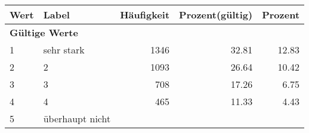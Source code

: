      \begin{longtable}{lXrrr}
     \toprule
     \textbf{Wert} & \textbf{Label} & \textbf{Häufigkeit} & \textbf{Prozent(gültig)} & \textbf{Prozent} \\
     \endhead
     \midrule
     \multicolumn{5}{l}{\textbf{Gültige Werte}}\\

     1 &
     \multicolumn{1}{X}{ sehr stark   } &


       \num{1346} &
       \num[round-mode=places,round-precision=2]{32.81} &
         \num[round-mode=places,round-precision=2]{12.83} \\

     2 &
     \multicolumn{1}{X}{ 2   } &


       \num{1093} &
       \num[round-mode=places,round-precision=2]{26.64} &
         \num[round-mode=places,round-precision=2]{10.42} \\

     3 &
     \multicolumn{1}{X}{ 3   } &


       \num{708} &
       \num[round-mode=places,round-precision=2]{17.26} &
         \num[round-mode=places,round-precision=2]{6.75} \\

     4 &
     \multicolumn{1}{X}{ 4   } &


       \num{465} &
       \num[round-mode=places,round-precision=2]{11.33} &
         \num[round-mode=places,round-precision=2]{4.43} \\

     5 &
     \multicolumn{1}{X}{ überhaupt nicht   } &



\end{longtable}
